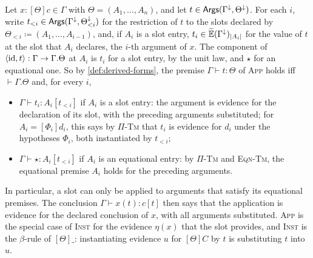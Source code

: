 \begin{remark}\label{rem:app}
    Let $x : [\Theta]c \in \Gamma$ with $\Theta = (A_1, \ldots, A_n)$, and let $t \in \mathsf{Args}(\Gamma^{\downarrow}, \Theta^{\downarrow})$. For each $i$, write $t_{<i} \in \mathsf{Args}(\Gamma^{\downarrow}, \Theta_{<i}^{\downarrow})$ for the restriction of $t$ to the slots declared by $\Theta_{<i} \coloneqq (A_1, \ldots, A_{i-1})$, and, if $A_i$ is a slot entry, $t_i \in \widetilde{\mathbb{E}}(\Gamma^{\downarrow})_{|A_i|}$ for the value of $t$ at the slot that $A_i$ declares, the $i$-th argument of $x$. The component of $\langle \mathrm{id}, t \rangle : \Gamma \to \Gamma.\Theta$ at $A_i$ is $t_i$ for a slot entry, by the unit law, and $\star$ for an equational one. So by \cref{def:derived-forms}, the premise $\Gamma \vdash t : \Theta$ of \textsc{App} holds iff $\vdash \Gamma.\Theta$ and, for every $i$,
    \begin{itemize}
        \item $\Gamma \vdash t_i : A_i[t_{<i}]$ if $A_i$ is a slot entry: the argument is evidence for the declaration of its slot, with the preceding arguments substituted; for $A_i = [\Phi_i]d_i$, this says by \textsc{$\Pi$-Tm} that $t_i$ is evidence for $d_i$ under the hypotheses $\Phi_i$, both instantiated by $t_{<i}$;
        \item $\Gamma \vdash \star : A_i[t_{<i}]$ if $A_i$ is an equational entry: by \textsc{$\Pi$-Tm} and \textsc{Eqn-Tm}, the equational premise $A_i$ holds for the preceding arguments.
    \end{itemize}
    In particular, a slot can only be applied to arguments that satisfy its equational premises. The conclusion $\Gamma \vdash x(t) : c[t]$ then says that the application is evidence for the declared conclusion of $x$, with all arguments substituted. \textsc{App} is the special case of \textsc{Inst} for the evidence $\eta(x)$ that the slot provides, and \textsc{Inst} is the $\beta$-rule of $[\Theta]\_$: instantiating evidence $u$ for $[\Theta]C$ by $t$ is substituting $t$ into $u$.
\end{remark}
